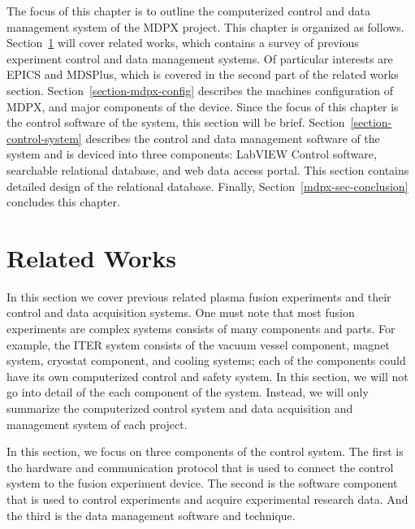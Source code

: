 The focus of this chapter is to outline the computerized control and data management system of the MDPX project. This chapter is organized as follows. Section~\ref{section-related-works} will cover related works, which contains a survey of previous experiment control and data management systems. Of particular interests are EPICS\cite{lecture:johnson_intro_to_epics} and MDSPlus\cite{stillerman1997mdsplus}, which is covered in the second part of the related works section. Section~\ref{section-mdpx-config} describes the machines configuration of MDPX, and major components of the device. Since the focus of this chapter is the control software of the system, this section will be brief. Section~\ref{section-control-system} describes the control and data management software of the system and is deviced into three components: LabVIEW Control software, searchable relational database, and web data access portal. This section contains detailed design of the relational database. Finally, Section~\ref{mdpx-sec-conclusion} concludes this chapter.


\section{Related Works}\label{section-related-works}

In this section we cover previous related plasma fusion experiments and their control and data acquisition systems. One must note that most fusion experiments are complex systems consists of many components and parts. For example, the ITER\cite{Rebut199585} system consists of the vacuum vessel component, magnet system, cryostat component, and cooling systems; each of the components could have its own computerized control and safety system. In this section, we will not go into detail of the each component of the system. Instead, we will only summarize the computerized control system and data acquisition and management system of each project.

In this section, we focus on three components of the control system. The first is the hardware and communication protocol that is used to connect the control system to the fusion experiment device. The second is the software component that is used to control experiments and acquire experimental research data. And the third is the data management software and technique.

